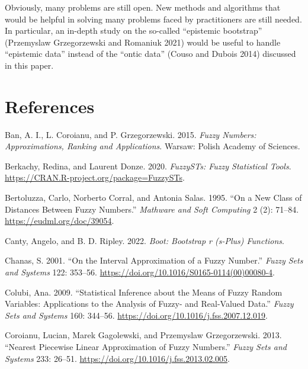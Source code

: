 Obviously, many problems are still open. New methods and algorithms that
would be helpful in solving many problems faced by practitioners are
still needed. In particular, an in-depth study on the so-called
``epistemic bootstrap'' (Przemyslaw Grzegorzewski and Romaniuk 2021) would be useful to handle
``epistemic data'' instead of the ``ontic data'' (Couso and Dubois 2014) discussed in
this paper.

\hypertarget{references}{%
\section*{References}\label{references}}

\hypertarget{refs}{}
\begin{CSLReferences}{1}{0}
\leavevmode{}%
Ban, A. I., L. Coroianu, and P. Grzegorzewski. 2015. \emph{Fuzzy Numbers: Approximations, Ranking and Applications}. Warsaw: Polish Academy of Sciences.

\leavevmode{}%
Berkachy, Redina, and Laurent Donze. 2020. \emph{FuzzySTs: Fuzzy Statistical Tools}. \url{https://CRAN.R-project.org/package=FuzzySTs}.

\leavevmode{}%
Bertoluzza, Carlo, Norberto Corral, and Antonia Salas. 1995. {``On a New Class of Distances Between Fuzzy Numbers.''} \emph{Mathware and Soft Computing} 2 (2): 71--84. \url{https://eudml.org/doc/39054}.

\leavevmode{}%
Canty, Angelo, and B. D. Ripley. 2022. \emph{Boot: Bootstrap r (s-Plus) Functions}.

\leavevmode{}%
Chanas, S. 2001. {``On the Interval Approximation of a Fuzzy Number.''} \emph{Fuzzy Sets and Systems} 122: 353--56. \url{https://doi.org/10.1016/S0165-0114(00)00080-4}.

\leavevmode{}%
Colubi, Ana. 2009. {``Statistical Inference about the Means of Fuzzy Random Variables: Applications to the Analysis of Fuzzy- and Real-Valued Data.''} \emph{Fuzzy Sets and Systems} 160: 344--56. \url{https://doi.org/10.1016/j.fss.2007.12.019}.

\leavevmode{}%
Coroianu, Lucian, Marek Gagolewski, and Przemyslaw Grzegorzewski. 2013. {``Nearest Piecewise Linear Approximation of Fuzzy Numbers.''} \emph{Fuzzy Sets and Systems} 233: 26--51. \url{https://doi.org/10.1016/j.fss.2013.02.005}.


\end{CSLReferences}

